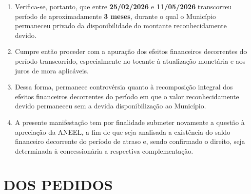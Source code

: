 \begin{enumerate}[resume]
    \item Verifica-se, portanto, que entre \textbf{25/02/2026} e \textbf{11/05/2026} transcorreu período de aproximadamente \textbf{3 meses}, durante o qual o Município permaneceu privado da disponibilidade do montante reconhecidamente devido.

    \item Cumpre então proceder com a apuração dos efeitos financeiros decorrentes do período transcorrido, especialmente no tocante à atualização monetária e aos juros de mora aplicáveis.

    \item Dessa forma, permanece controvérsia quanto à recomposição integral dos efeitos financeiros decorrentes do período em que o valor reconhecidamente devido permaneceu sem a devida disponibilização ao Município.

    \item A presente manifestação tem por finalidade submeter novamente a questão à apreciação da ANEEL, a fim de que seja analisada a existência do saldo financeiro decorrente do período de atraso e, sendo confirmado o direito, seja determinada à concessionária a respectiva complementação.
\end{enumerate}

\section{DOS PEDIDOS}

